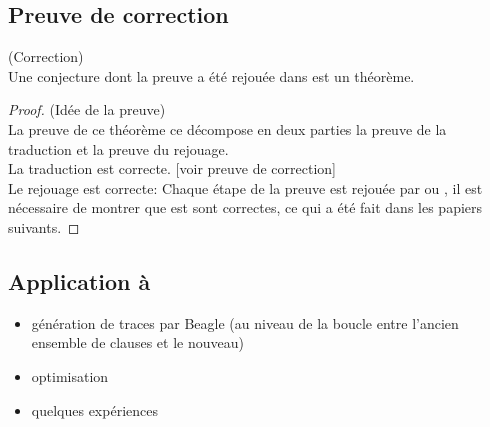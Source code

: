 \subsection{Preuve de correction}
\begin{thm}(Correction)
\\Une conjecture dont la preuve a été rejouée dans \holfour est un théorème.
\end{thm}

\begin{proof}(Idée de la preuve)
\\La preuve de ce théorème ce décompose en deux parties la preuve de la traduction et la preuve du rejouage.
\\La traduction est correcte. [voir preuve de correction]
\\Le rejouage est correcte: Chaque étape de la preuve est rejouée par \metistac ou \coopertac, il est nécessaire de montrer que \metistac est \coopertac sont correctes, ce qui a été fait dans les papiers suivants.
\end{proof}



\subsection{Application à \beagle}
\begin{itemize}
\item génération de traces par Beagle (au niveau de la boucle entre
  l'ancien ensemble de clauses et le nouveau)

\item optimisation

\item quelques expériences

\end{itemize}

